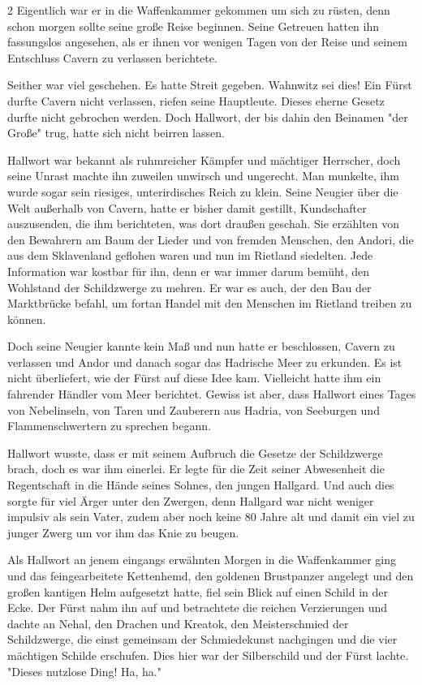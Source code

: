 \documentclass[10pt, a4paper, oneside]{book}
\begin{document}
\begin{multicols}{2}
Eigentlich war er in die Waffenkammer gekommen um sich zu rüsten, denn schon morgen sollte seine große Reise beginnen. Seine Getreuen hatten ihn fassungslos angesehen, als er ihnen vor wenigen Tagen von der Reise und seinem  Entschluss Cavern zu verlassen berichtete.\bigskip

Seither war viel geschehen. Es hatte Streit gegeben. Wahnwitz sei dies! Ein Fürst durfte Cavern nicht verlassen, riefen seine Hauptleute. Dieses eherne Gesetz durfte nicht gebrochen werden. Doch Hallwort, der bis dahin den Beinamen "der Große" trug, hatte sich nicht beirren lassen.\bigskip

Hallwort war bekannt als ruhmreicher Kämpfer und mächtiger Herrscher, doch seine Unrast machte ihn zuweilen unwirsch und ungerecht. Man munkelte, ihm wurde sogar sein riesiges, unterirdisches Reich zu klein. Seine Neugier über die Welt außerhalb von Cavern, hatte er bisher damit gestillt, Kundschafter auszusenden, die ihm berichteten, was dort draußen geschah. Sie erzählten von den Bewahrern am Baum der Lieder und von fremden Menschen, den Andori, die aus dem Sklavenland geflohen waren und nun im Rietland siedelten. Jede Information war kostbar für ihn, denn er war immer darum bemüht, den Wohlstand der Schildzwerge zu mehren. Er war es auch, der den Bau der Marktbrücke befahl, um fortan Handel mit den Menschen im Rietland treiben zu können.\bigskip

Doch seine Neugier kannte kein Maß und nun hatte er beschlossen, Cavern zu verlassen und Andor und danach sogar das Hadrische Meer zu erkunden. Es ist nicht überliefert, wie der Fürst auf diese Idee kam. Vielleicht hatte ihm ein fahrender Händler vom Meer berichtet. Gewiss ist aber, dass Hallwort eines Tages von Nebelinseln, von Taren und Zauberern aus Hadria, von Seeburgen und Flammenschwertern zu sprechen begann.\bigskip

Hallwort wusste, dass er mit seinem Aufbruch die Gesetze der Schildzwerge brach, doch es war ihm einerlei. Er legte für die Zeit seiner Abwesenheit die Regentschaft in die Hände seines Sohnes, den jungen Hallgard. Und auch dies sorgte für viel Ärger unter den Zwergen, denn Hallgard war nicht weniger impulsiv als sein Vater, zudem aber noch keine 80 Jahre alt und damit ein viel zu junger Zwerg um vor ihm das Knie zu beugen.\bigskip

Als Hallwort an jenem eingangs erwähnten Morgen in die Waffenkammer ging und das feingearbeitete Kettenhemd, den goldenen Brustpanzer angelegt und den großen kantigen Helm aufgesetzt hatte, fiel sein Blick auf einen Schild in der Ecke. Der Fürst nahm ihn auf und betrachtete die reichen Verzierungen und dachte an Nehal, den Drachen und Kreatok, den Meisterschmied der Schildzwerge, die einst gemeinsam der Schmiedekunst nachgingen und die vier mächtigen Schilde erschufen. Dies hier war der Silberschild und der Fürst lachte. "Dieses nutzlose Ding! Ha, ha."\bigskip


\end{multicols}
\end{document}

